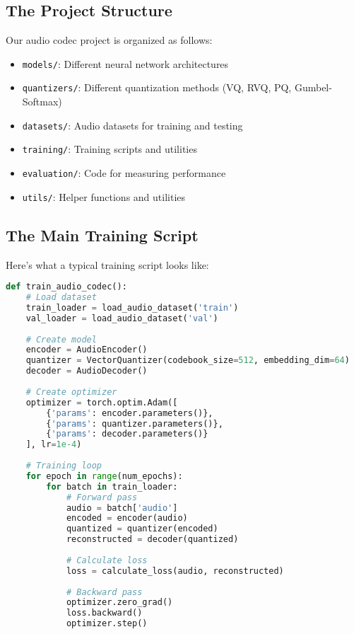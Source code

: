 \documentclass[12pt]{article}
\begin{document}
\subsection{The Project Structure}

Our audio codec project is organized as follows:
\begin{itemize}
    \item \texttt{models/}: Different neural network architectures
    \item \texttt{quantizers/}: Different quantization methods (VQ, RVQ, PQ, Gumbel-Softmax)
    \item \texttt{datasets/}: Audio datasets for training and testing
    \item \texttt{training/}: Training scripts and utilities
    \item \texttt{evaluation/}: Code for measuring performance
    \item \texttt{utils/}: Helper functions and utilities
\end{itemize}

\subsection{The Main Training Script}

Here's what a typical training script looks like:

\begin{lstlisting}[language=Python, basicstyle=\small]
def train_audio_codec():
    # Load dataset
    train_loader = load_audio_dataset('train')
    val_loader = load_audio_dataset('val')
    
    # Create model
    encoder = AudioEncoder()
    quantizer = VectorQuantizer(codebook_size=512, embedding_dim=64)
    decoder = AudioDecoder()
    
    # Create optimizer
    optimizer = torch.optim.Adam([
        {'params': encoder.parameters()},
        {'params': quantizer.parameters()},
        {'params': decoder.parameters()}
    ], lr=1e-4)
    
    # Training loop
    for epoch in range(num_epochs):
        for batch in train_loader:
            # Forward pass
            audio = batch['audio']
            encoded = encoder(audio)
            quantized = quantizer(encoded)
            reconstructed = decoder(quantized)
            
            # Calculate loss
            loss = calculate_loss(audio, reconstructed)
            
            # Backward pass
            optimizer.zero_grad()
            loss.backward()
            optimizer.step()
\end{lstlisting}
\end{document}
